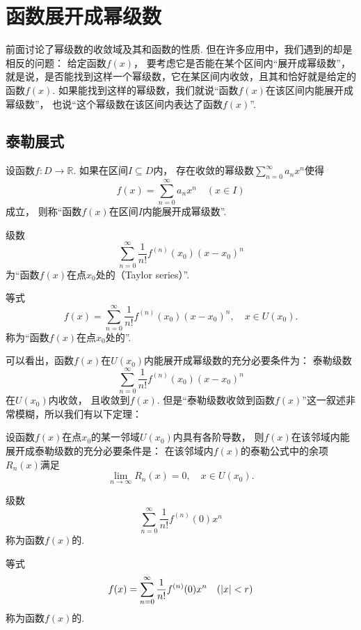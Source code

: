 \section{函数展开成幂级数}
前面讨论了幂级数的收敛域及其和函数的性质.
但在许多应用中，我们遇到的却是相反的问题：
给定函数\(f(x)\)，
要考虑它是否能在某个区间内“展开成幂级数”，
就是说，是否能找到这样一个幂级数，它在某区间内收敛，且其和恰好就是给定的函数\(f(x)\).
如果能找到这样的幂级数，我们就说“函数\(f(x)\)在该区间内能展开成幂级数”，
也说“这个幂级数在该区间内表达了函数\(f(x)\)”.

\subsection{泰勒展式}
\begin{definition}
设函数\(f\colon D\to\mathbb{R}\).
如果在区间\(I \subseteq D\)内，
存在收敛的幂级数\(\sum_{n=0}^\infty a_n x^n\)使得\[
	f(x) = \sum_{n=0}^\infty a_n x^n
	\quad(x \in I)
\]成立，
则称“函数\(f(x)\)在区间\(I\)内能展开成幂级数”.
\end{definition}

\begin{definition}
级数\[
	\sum_{n=0}^\infty \frac{1}{n!} f^{(n)}(x_0) (x-x_0)^n
\]
为“函数\(f(x)\)在点\(x_0\)处的（Taylor series）”.

等式\[
	f(x) = \sum_{n=0}^\infty {\frac{1}{n!} f^{(n)}(x_0) (x-x_0)^n},
	\quad x \in U(x_0).
\]
称为“函数\(f(x)\)在点\(x_0\)处的”.
\end{definition}

可以看出，函数\(f(x)\)在\(U(x_0)\)内能展开成幂级数的充分必要条件为：
泰勒级数\[
	\sum_{n=0}^\infty {\frac{1}{n!} f^{(n)}(x_0) (x-x_0)^n}
\]在\(U(x_0)\)内收敛，
且收敛到\(f(x)\).
但是“泰勒级数收敛到函数\(f(x)\)”这一叙述非常模糊，所以我们有以下定理：
\begin{theorem}
设函数\(f(x)\)在点\(x_0\)的某一邻域\(U(x_0)\)内具有各阶导数，
则\(f(x)\)在该邻域内能展开成泰勒级数的充分必要条件是：
在该邻域内\(f(x)\)的泰勒公式中的余项\(R_n(x)\)满足\[
	\lim_{n\to\infty} R_n(x) = 0,
	\quad x \in U(x_0).
\]
\end{theorem}

\begin{definition}
级数\[
	\sum_{n=0}^\infty \frac{1}{n!} f^{(n)}(0) x^n
\]
称为函数\(f(x)\)的.

等式\[
	f(x) = \sum_{n=0}^\infty {\frac{1}{n!} f^{(n)}(0) x^n}
	\quad(\abs{x} < r)
\]
称为函数\(f(x)\)的.
\end{definition}

